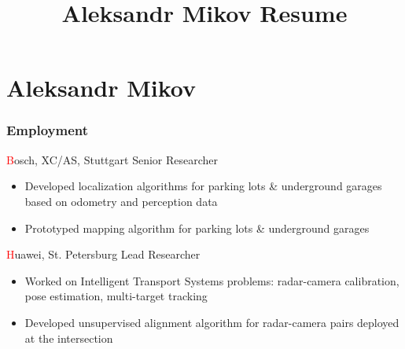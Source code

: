 \documentclass{tccv}
\title{Aleksandr Mikov Resume}
\makeatletter
\newcommand{\about@me}{}
\newcommand{\aboutme}[1]{\renewcommand{\about@me}{\subsection{About Me}#1}}
\makeatother
\begin{document}
\aboutme{\center{\textcolor{forestgreen}{\textbf{PhD}}, Researcher and algorithm developer in the indoor and outdoor navigation field\\with an emphasis on automotive and pedestrian applications.}}
\part{Aleksandr Mikov}


\section{Employment}

\begin{eventlist}
     {\textcolor{red}{B}osch, XC/AS, Stuttgart}
     {Senior Researcher}
\begin{itemize}
     \item Developed localization algorithms for parking lots \& underground garages based on odometry and perception data
     \item Prototyped mapping algorithm for parking lots \& underground garages
\end{itemize}

     {\textcolor{red}{H}uawei, St. Petersburg}
     {Lead Researcher}
\begin{itemize}
     \item Worked on Intelligent Transport Systems problems: radar-camera calibration, pose estimation, multi-target tracking
     \item Developed unsupervised alignment algorithm for radar-camera pairs deployed at the intersection
\end{itemize}


\end{eventlist}
\end{document}
